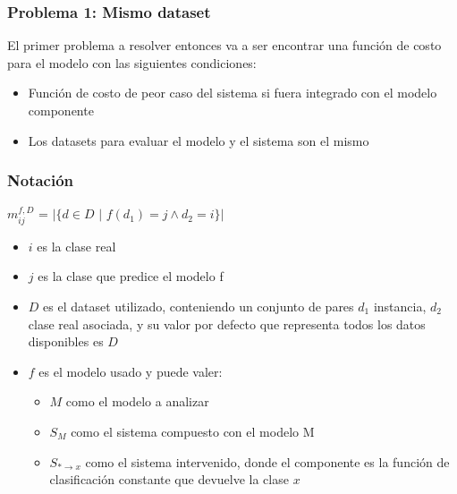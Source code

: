 \begin{frame}
\frametitle{Problema 1: Mismo dataset}
El primer problema a resolver entonces va a ser encontrar una funci\'on de costo para el modelo con las siguientes condiciones: \\
\vspace{3mm}
\begin{itemize}
\item Funci\'on de costo de peor caso del sistema si fuera integrado con el modelo componente
\item Los datasets para evaluar el modelo y el sistema son el mismo
\end{itemize}
\end{frame}



\begin{frame}
\frametitle{Notaci\'on}
$m^{f,D}_{ij}$ = $|$$\{d \in D $ $|$ $f(d_{1})=j \land d_{2}=i\}$$|$ \\
\vspace{3mm}
\begin{itemize}
\item $i$ es la clase real
\item $j$ es la clase que predice el modelo f
\item $D$ es el dataset utilizado, conteniendo un conjunto de pares $d_1$ instancia, $d_2$ clase real asociada, y su valor por defecto que representa todos los datos disponibles es $D$
\item $f$ es el modelo usado y puede valer:\\
\begin{itemize}
\item $M$ como el modelo a analizar\\
\item $S_{M}$ como el sistema compuesto con el modelo M\\
\item $S_{*\rightarrow x}$ como el sistema intervenido, donde el componente es la funci\'on de clasificaci\'on constante que devuelve la clase $x$
\end{itemize}
\end{itemize}
\end{frame}



